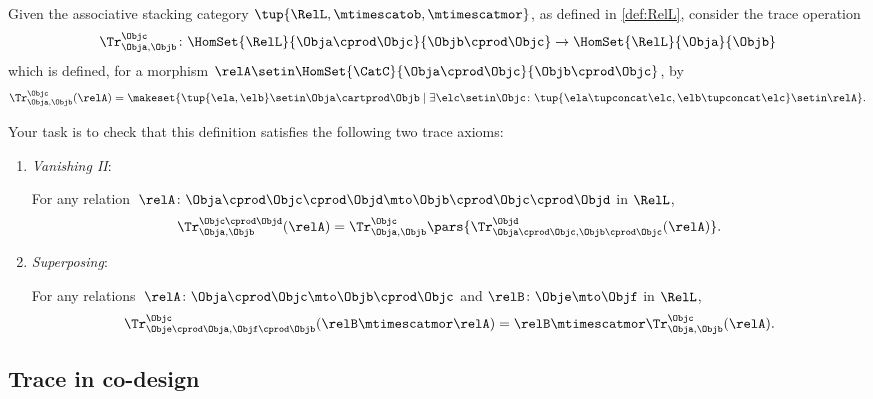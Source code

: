 \begin{gradedexercise}
    \label{eq:TracingRelations}

    Given the associative stacking category $\tup{\RelL, \mtimescatob, \mtimescatmor}$, as defined in \cref{def:RelL}, consider the trace operation
    $$\Tr_{\Obja,\Objb}^\Objc \colon \HomSet{\RelL}{\Obja \cprod \Objc}{\Objb \cprod \Objc}\to \HomSet{\RelL}{\Obja}{\Objb}$$
    which is defined, for a morphism $\relA \setin\HomSet{\CatC}{\Obja \cprod \Objc}{\Objb\cprod \Objc}$, by
    \begin{equation}
        \Tr_{\Obja,\Objb}^\Objc(\relA) = \makeset{\tup{\ela, \elb} \setin\Obja \cartprod \Objb \mid \exists \elc \setin\Objc \colon \tup{\ela \tupconcat \elc, \elb \tupconcat \elc} \setin\relA}.
    \end{equation}

    Your task is to check that this definition satisfies the following two trace axioms:

    \begin{enumerate}

        \item \emph{Vanishing II}:

              For any relation~$\relA \colon \Obja \cprod \Objc \cprod \Objd \mto \Objb\cprod \Objc \cprod \Objd$ in $\RelL$,
              \begin{equation}
                  \Tr_{\Obja,\Objb}^{\Objc\cprod \Objd}(\relA) = \Tr_{\Obja,\Objb}^\Objc\pars{
                      \Tr_{\Obja \cprod \Objc, \Objb \cprod \Objc}^\Objd(\relA)}.
              \end{equation}

        \item \emph{Superposing}:

              For any relations~$\relA \colon \Obja\cprod \Objc \mto \Objb\cprod \Objc$ and $\relB \colon \Obje \mto \Objf$ in $\RelL$,
              \begin{equation}
                  \Tr_{\Obje\cprod \Obja,\Objf\cprod \Objb}^{\Objc}(\relB \mtimescatmor \relA) = \relB \mtimescatmor \Tr_{\Obja,\Objb}^\Objc(\relA).
              \end{equation}
    \end{enumerate}
\end{gradedexercise}



\subsection{Trace in co-design}


